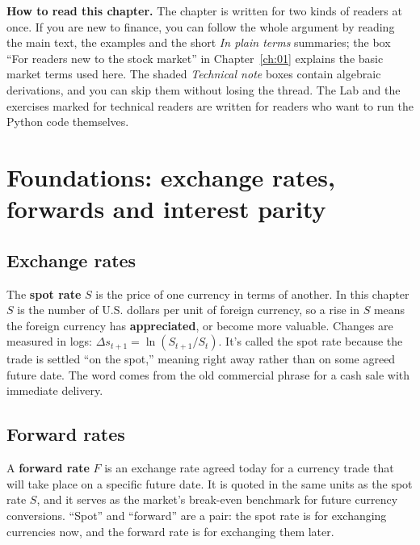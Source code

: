 \begin{callout}
\textbf{How to read this chapter.} The chapter is written for two kinds of readers at once. If you are new to finance, you can follow the whole argument by reading the main text, the examples and the short \emph{In plain terms} summaries; the box ``For readers new to the stock market'' in Chapter~\ref{ch:01} explains the basic market terms used here. The shaded \emph{Technical note} boxes contain algebraic derivations, and you can skip them without losing the thread. The Lab and the exercises marked for technical readers are written for readers who want to run the Python code themselves.
\end{callout}

\section{Foundations: exchange rates, forwards and interest parity}
\label{sec:06-foundations}

\subsection{Exchange rates}

The \textbf{spot rate} $S$ is the price of one currency in terms of another. In this chapter $S$ is the number of U.S. dollars per unit of foreign currency, so a rise in $S$ means the foreign currency has \textbf{appreciated}, or become more valuable. Changes are measured in logs: $\Delta s_{t+1} = \ln(S_{t+1}/S_t)$.
It’s called the spot rate because the trade is settled “on the spot,” meaning right away rather than on some agreed future date. The word comes from the old commercial phrase for a cash sale with immediate delivery.



\subsection{Forward rates}

A \textbf{forward rate} $F$ is an exchange rate agreed today for a currency trade that will take place on a specific future date. It is quoted in the same units as the spot rate $S$, and it serves as the market's break-even benchmark for future currency conversions.
“Spot” and “forward” are a pair: the spot rate is for exchanging currencies now, and the forward rate is for exchanging them later.

